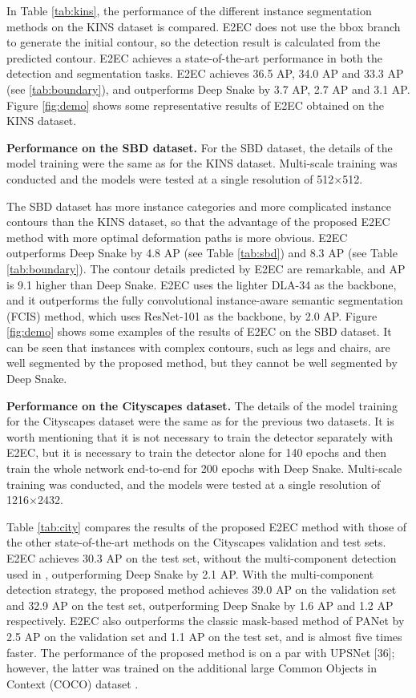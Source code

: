 \documentclass[10pt,twocolumn,letterpaper]{article}
\begin{document}
In Table \ref{tab:kins}, the performance of the different instance segmentation methods on the KINS dataset is compared. E2EC does not use the bbox branch to generate the initial contour, so the detection result is calculated from the predicted contour. E2EC achieves a state-of-the-art performance in both the detection and segmentation tasks. E2EC achieves 36.5 AP, 34.0 AP and 33.3 AP (see \ref{tab:boundary}), and outperforms Deep Snake by 3.7 AP, 2.7 AP and 3.1 AP. Figure \ref{fig:demo} shows some representative results of E2EC obtained on the KINS dataset.

\textbf{Performance on the SBD dataset.} For the SBD dataset, the details of the model training were the same as for the KINS dataset. Multi-scale training was conducted and the models were tested at a single resolution of 512×512.

The SBD dataset has more instance categories and more complicated instance contours than the KINS dataset, so that the advantage of the proposed E2EC method with more optimal deformation paths is more obvious. E2EC outperforms Deep Snake by 4.8 AP (see Table \ref{tab:sbd}) and 8.3 AP (see Table \ref{tab:boundary}). The contour details predicted by E2EC are remarkable, and AP is 9.1 higher than Deep Snake. E2EC uses the lighter DLA-34 as the backbone, and it outperforms the fully convolutional instance-aware semantic segmentation (FCIS) method, which uses ResNet-101 as the backbone, by 2.0 AP. Figure \ref{fig:demo} shows some examples of the results of E2EC on the SBD dataset. It can be seen that instances with complex contours, such as legs and chairs, are well segmented by the proposed method, but they cannot be well segmented by Deep Snake.

\textbf{Performance on the Cityscapes dataset.} The details of the model training for the Cityscapes dataset were the same as for the previous two datasets. It is worth mentioning that it is not necessary to train the detector separately with E2EC, but it is necessary to train the detector alone for 140 epochs and then train the whole network end-to-end for 200 epochs with Deep Snake. Multi-scale training was conducted, and the models were tested at a single resolution of 1216×2432.

Table \ref{tab:city} compares the results of the proposed E2EC method with those of the other state-of-the-art methods on the Cityscapes validation and test sets. E2EC achieves 30.3 AP on the test set, without the multi-component detection used in \cite{deepsnake}, outperforming Deep Snake by 2.1 AP. With the multi-component detection strategy, the proposed method achieves 39.0 AP on the validation set and 32.9 AP on the test set, outperforming Deep Snake by 1.6 AP and 1.2 AP respectively. E2EC also outperforms the classic mask-based method of PANet by 2.5 AP on the validation set and 1.1 AP on the test set, and is almost five times faster. The performance of the proposed method is on a par with UPSNet [36]; however, the latter was trained on the additional large Common Objects in Context (COCO) dataset \cite{coco}.
\end{document}
